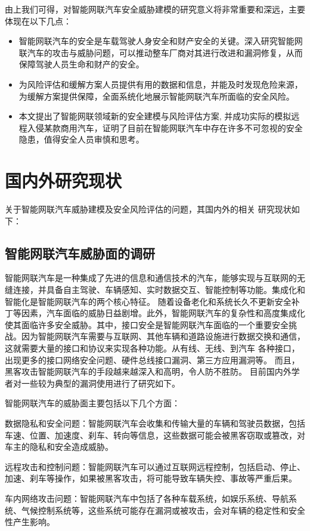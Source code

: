 由上我们可得，对智能网联汽车安全威胁建模的研究意义将非常重要和深远，主要体现在以下几点：
\begin{itemize}
  \item 智能网联汽车的安全是车载驾驶人身安全和财产安全的关键。深入研究智能网联汽车的攻击与威胁问题，可以推动整车厂商对其进行改进和漏洞修复，从而保障驾驶人员生命和财产的安全。
  \item 为风险评估和缓解方案人员提供有用的数据和信息，并能及时发现危险来源，为缓解方案提供保障，全面系统化地展示智能网联汽车所面临的安全风险。
  \item 本文提出了智能网联领域新的安全建模与风险评估方案, 并成功实际的模拟远程入侵某款商用汽车，证明了目前在智能网联汽车中存在许多不可忽视的安全隐患，值得安全人员审慎和思考。  
\end{itemize}
\section{国内外研究现状}
关于智能网联汽车威胁建模及安全风险评估的问题，其国内外的相关
研究现状如下：

\subsection{智能网联汽车威胁面的调研}
智能网联汽车是一种集成了先进的信息和通信技术的汽车，能够实现与互联网的无缝连接，并具备自主驾驶、车辆感知、实时数据交互、智能控制等功能。集成化和智能化是智能网联汽车的两个核心特征。
随着设备老化和系统长久不更新安全补丁等因素，汽车面临的威胁日益剧增。此外，智能网联汽车的复杂性和高度集成化使其面临许多安全威胁。其中，接口安全是智能网联汽车面临的一个重要安全挑战。因为智能网联汽车需要与互联网、其他车辆和道路设施进行数据交换和通信，这就需要大量的接口和协议来实现各种功能。从有线、无线、到汽车
各种接口，出现更多的接口网络安全问题、硬件总线接口漏洞、第三方应用漏洞等。
而且，黑客攻击智能网联汽车的手段越来越深入和高明，令人防不胜防。
目前国内外学者对一些较为典型的漏洞使用进行了研究如下。

智能网联汽车的威胁面主要包括以下几个方面：

数据隐私和安全问题：智能网联汽车会收集和传输大量的车辆和驾驶员数据，包括车速、位置、加速度、刹车、转向等信息，这些数据可能会被黑客窃取或篡改，对车主的隐私和安全造成威胁。

远程攻击和控制问题：智能网联汽车可以通过互联网远程控制，包括启动、停止、加速、刹车等操作，如果被黑客攻击，将可能导致车辆失控、事故等严重后果。

车内网络攻击问题：智能网联汽车中包括了各种车载系统，如娱乐系统、导航系统、气候控制系统等，这些系统可能存在漏洞或被攻击，会对车辆的稳定性和安全性产生影响。

